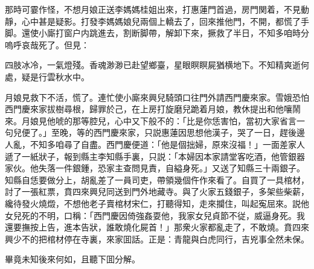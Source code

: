 那時可霎作怪，不想月娘正送李媽媽桂姐出來，打惠蓮門首過，房門関着，不見動靜，心中甚是疑影。打發李媽媽娘兒兩個上轎去了，回來推他門，不開，都慌了手脚。還使小廝打窗户内跳進去，割断脚帶，解卸下來，撅救了半日，不知多咱時分嗚呼哀哉死了。但見：

\begin{myquote}
四肢冰冷，一氣燈殘。香魂渺渺已赴望鄉臺，星眼瞑瞑屍猶横地下。不知精爽逝何處，疑是行雲秋水中。
\end{myquote}

月娘見救下不活，慌了。連忙使小廝來興兒騎頭口往門外請西門慶來家。雪娥恐怕西門慶來家拔樹尋根，歸罪於己，在上房打旋磨兒跪着月娘，教休提出和他嚷鬧來。月娘見他唬的那等腔兒，心中又下般不的：「比是你恁害怕，當初大家省言一句兒便了。」至晚，等的西門慶來家，只説惠蓮因思想他漢子，哭了一日，趕後邊人亂，不知多咱尋了自盡。西門慶便道：「他是個拙婦，原來沒福！」一面差家人遞了一紙狀子，報到縣主李知縣手裏，只説：「本婦因本家請堂客吃酒，他管銀器家伙。他失落一件銀鍾，恐家主查問見責，自縊身死。」又送了知縣三十兩銀子。知縣自恁要做分上，胡亂差了一員司吏，帶領幾個仵作來看了。自買了一具棺材，討了一張紅票，賁四來興兒同送到門外地藏寺。與了火家五錢銀子，多架些柴薪，纔待發火燒燬，不想他老子賣棺材宋仁，打聽得知，走來攔住，叫起寃屈來。説他女兒死的不明，口稱：「西門慶因倚強姦耍他，我家女兒貞節不従，威逼身死。我還要撫按上告，進本告狀，誰敢燒化屍首！」那衆火家都亂走了，不敢燒。賁四來興少不的把棺材停在寺裏，來家囬話。正是：青龍與白虎同行，吉兇事全然未保。

畢竟未知後來何如，且聽下囬分解。


